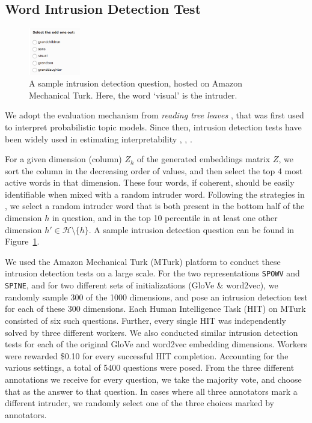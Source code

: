\documentclass[letterpaper]{article} %
\begin{document}
\subsection{Word Intrusion Detection Test}
\label{sec:intrusiontest}

\begin{figure}[t]
\centering
\includegraphics[width=0.2\textwidth]{amt}
\caption{A sample intrusion detection question, hosted on Amazon Mechanical Turk. Here, the word `visual' is the intruder.}
\label{fig:amt}
\end{figure}

We adopt the evaluation mechanism from \textit{reading tree leaves} \cite{chang2009reading}, that was first used to interpret probabilistic topic models. Since then, intrusion detection tests have been widely used in estimating interpretability \cite{murphy2012learning}, \cite{fyshe2014interpretable}, \cite{faruqui2015sparse}.

For a given dimension (column) $Z_h$ of the generated embeddings matrix $Z$, we sort the column in the decreasing order of values, and then select the top 4 most active words in that dimension. These four words, if coherent, should be easily identifiable when mixed with a random intruder word. Following the strategies in \cite{murphy2012learning,faruqui2015sparse}, we select a random intruder word that is both present in the bottom half of the dimension $h$ in question, and in the top 10 percentile in at least one other dimension $h' \in \mathcal{H} \setminus \{h\}$. A sample intrusion detection question can be found in Figure~\ref{fig:amt}.

We used the Amazon Mechanical Turk (MTurk) platform to conduct these intrusion detection tests on a large scale. For the two representations \texttt{SPOWV} and \texttt{SPINE}, and for two different sets of initializations (GloVe \& word2vec), we randomly sample 300 of the 1000 dimensions, and pose an intrusion detection test for each of these 300 dimensions. Each Human Intelligence Task (HIT) on MTurk consisted of six such questions. Further, every single HIT was independently solved by three different workers. We also conducted similar intrusion detection tests for each of the original GloVe and word2vec embedding dimensions. Workers were rewarded \$0.10 for every successful HIT completion. Accounting for the various settings, a total of 5400 questions were posed. From the three different annotations we receive for every question, we take the majority vote, and choose that as the answer to that question. In cases where all three annotators mark a different intruder, we randomly select one of the three choices marked by annotators.
\end{document}
